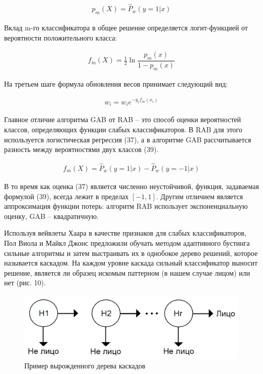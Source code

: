 \begin{gather}
p_m(X) = \hat{P}_w(y = 1|x)
\end{gather}

Вклад m-го классификатора в общее решение определяется логит-функцией от вероятности положительного класса:

\begin{gather}
f_m(X) = \frac{1}{2} \ln \dfrac{p_m(x)}{1-p_m(x)}
\end{gather}

На третьем шаге формула обновления весов принимает следующий вид:

\begin{gather}
w_i = w_i e^{-y_i f_m (x_i)}
\end{gather}

Главное отличие алгоритма GAB от RAB -- это способ оценки вероятностей классов, определяющих функции слабых классификаторов. В RAB для этого используется логистическая регрессия (37), а в алгоритме GAB рассчитывается разность между вероятностями двух классов (39).

\begin{gather}
f_m(X)=\hat{P}_w(y=1|x)-\hat{P}_w(y=-1|x)
\end{gather}

В то время как оценка (37) является численно неустойчивой, функция, задаваемая формулой (39), всегда лежит в пределах $[−1, 1]$. Другим отличием является аппроксимация функции потерь: алгоритм RAB использует экспоненциальную оценку, GAB -- квадратичную.

Используя вейвлеты Хаара в качестве признаков для слабых классификаторов, Пол Виола и Майкл Джонс предложили обучать методом адаптивного бустинга сильные алгоритмы и затем выстраивать их в однобокое дерево решений, которое называется каскадом. На каждом уровне каскада сильный классификатор выносит решение, является ли образец искомым паттерном (в нашем случае лицом) или нет (рис. 10).

\begin{figure}[h!]
\centering
\includegraphics[scale=0.45]{res/pic010}
\caption{Пример вырожденного дерева каскадов}
\end{figure}

